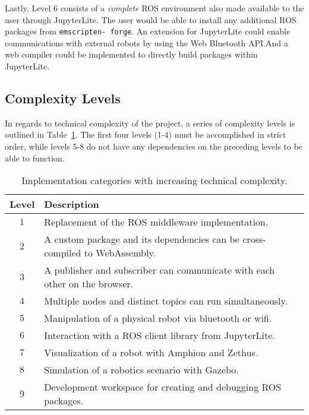         Lastly, Level 6 consists of a \textit{complete} ROS environment also made available to the user through JupyterLite. The user would be able to install any additional ROS packages from \texttt{emscripten- forge}. An extension for JupyterLite could enable communications with external robots by using the Web Bluetooth API.\@ And a web compiler could be implemented to directly build packages within JupyterLite.


    \subsection{Complexity Levels}

        In regards to technical complexity of the project, a series of complexity levels is outlined in Table~\ref{tab:techlevels}. The first four levels (1-4) must be accomplished in strict order, while levels 5-8 do not have any dependencies on the preceding levels to be able to function.        

        \begin{table}[htbp]
            \color{textColor}
            \centering	
            \caption{Implementation categories with increasing technical complexity.}
                \begin{tabular}{cl}
                    \toprule
                    \textbf{Level} & \textbf{Description} \\
                    \midrule
                    $1$ & Replacement of the \ac{ROS} middleware implementation. \\ [0.3em]
                    $2$ & A custom package and its dependencies can be cross-compiled to WebAssembly. \\[0.3em]
                    $3$ & A publisher and subscriber can communicate with each other on the browser.\\[0.3em]
                    $4$ & Multiple nodes and distinct topics can run simultaneously. \\[0.3em]
                    $5$ & Manipulation of a physical robot via bluetooth or wifi. \\[0.3em]
                    $6$ & Interaction with a ROS client library from JupyterLite. \\[0.3em]
                    $7$ & Visualization of a robot with Amphion and Zethus. \\[0.3em]
                    $8$ & Simulation of a robotics scenario with Gazebo. \\[0.3em]
                    $9$ & Development workspace for creating and debugging ROS packages. \\
                \bottomrule
            \end{tabular}\label{tab:techlevels}
        \end{table}

